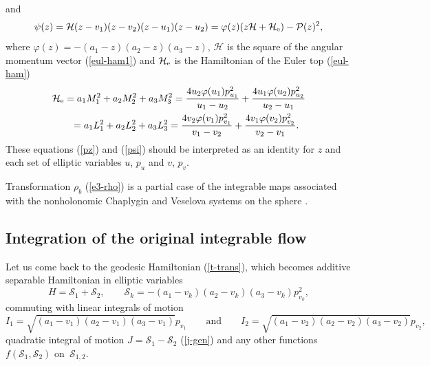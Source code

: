 \documentclass[10pt,a4paper]{amsart}
\numberwithin{equation}{section}
\begin{document}
and
\begin{equation} \label{psi}
\psi(z)=\mathcal H(z-v_1)(z-v_2)(z-u_1)(z-u_2)=\varphi(z)(z\mathcal H+\mathcal H_{\rm e})-\mathcal P(z)^2 ,
\end{equation}
where $ \varphi(z)=-(a_1-z)(a_2-z)(a_3-z)$, $\mathcal H$ is the square of the angular momentum vector (\ref{eul-ham1}) and $\mathcal H_{\rm e}$ is the Hamiltonian of the Euler top (\ref{eul-ham})
\begin{gather*}
\mathcal H_{\rm e}= a_1M_1^2+a_2M_2^2+a_3M_3^2=\dfrac{4u_2\varphi(u_1)p_{u_1}^2}{u_1 - u_2} +\dfrac{4u_1\varphi(u_2)p_{u_2}^2}{u_2-u_1}\\
\hphantom{\mathcal H_e}{}
= a_1L_1^2+a_2L_2^2+a_3L_3^2=\dfrac{4v_2\varphi(v_1)p_{v_1}^2}{v_1 - v_2} +\dfrac{4v_1\varphi(v_2)p_{v_2}^2}{v_2-v_1} .
\end{gather*}
These equations (\ref{pz}) and (\ref{psi}) should be interpreted as an identity for $z$ and each set of elliptic variables $u$, $p_u$ and $v$, $p_v$.

Transformation $\rho_b$ (\ref{e3-rho}) is a partial case of the integrable maps associated with the nonholonomic Chaplygin and Veselova systems on the sphere \cite{ts17v,ts17c}.

\subsection{Integration of the original integrable flow}
Let us come back to the geodesic Hamiltonian (\ref{t-trans}), which becomes additive separable Hamiltonian in elliptic variables
\begin{equation}\label{ham-sep-m}
H=\mathcal{S}_1+\mathcal{S}_2 ,\qquad\mathcal{S}_k=-(a_1-v_k)(a_2-v_k)(a_3-v_k)p_{v_k}^2 ,
\end{equation}
commuting with linear integrals of motion
\[
I_1=\sqrt{(a_1-v_1)(a_2-v_1)(a_3-v_1)} p_{v_1}\qquad\text{and}\qquad I_2=\sqrt{(a_1-v_2)(a_2-v_2)(a_3-v_2)} p_{v_2} ,
\]
quadratic integral of motion $J=\mathcal{S}_1-\mathcal{S}_2$ (\ref{j-gen}) and any other functions $f(\mathcal{S}_1,\mathcal{S}_2)$ on~$\mathcal{S}_{1,2}$.
\end{document}

